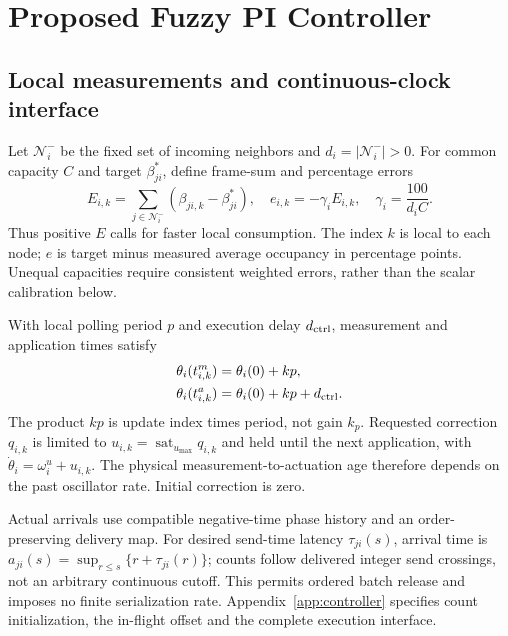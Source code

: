 \section{Proposed Fuzzy PI Controller}
\label{sec:fpi_controller}

\subsection{Local measurements and continuous-clock interface}
\label{subsec:fpi_laws}
Let $\mathcal N_i^-$ be the fixed set of incoming neighbors and
$d_i=|\mathcal N_i^-|>0$. For common capacity $C$ and target
$\beta_{ji}^*$, define frame-sum and percentage errors
\begin{equation}
 E_{i,k}=\sum_{j\in\mathcal N_i^-}(\beta_{ji,k}-\beta_{ji}^*),
 \quad e_{i,k}=-\gamma_iE_{i,k},\quad\gamma_i=\frac{100}{d_iC}.
 \label{eq:fpi_error}
\end{equation}
Thus positive $E$ calls for faster local consumption. The index $k$
is local to each node; $e$ is target minus measured average occupancy
in percentage points. Unequal capacities require consistent weighted
errors, rather than the scalar calibration below.

With local polling period $p$ and execution delay $d_{\rm ctrl}$,
measurement and application times satisfy
\begin{align}
 \theta_i(t^m_{i,k})&=\theta_i(0)+kp,\nonumber\\
 \theta_i(t^a_{i,k})&=\theta_i(0)+kp+d_{\rm ctrl}.
 \label{eq:fpi_local_schedule}
\end{align}
The product $kp$ is update index times period, not gain $k_p$.
Requested correction $q_{i,k}$ is limited to
$u_{i,k}=\operatorname{sat}_{u_{\max}}q_{i,k}$ and held until the
next application, with $\dot\theta_i=\omega_i^u+u_{i,k}$.
The physical measurement-to-actuation age therefore depends on the
past oscillator rate. Initial correction is zero.

Actual arrivals use compatible negative-time phase history and an
order-preserving delivery map. For desired send-time latency
$\tau_{ji}(s)$, arrival time is
$a_{ji}(s)=\sup_{r\le s}\{r+\tau_{ji}(r)\}$; counts follow delivered
integer send crossings, not an arbitrary continuous cutoff. This
permits ordered batch release and imposes no finite serialization rate.
Appendix~\ref{app:controller} specifies count initialization, the
in-flight offset and the complete execution interface.

